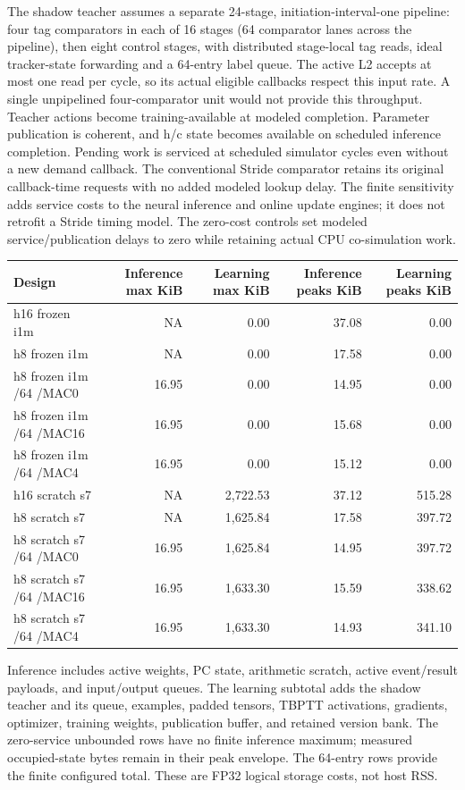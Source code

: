 \documentclass[10pt]{article}
\begin{document}
The shadow teacher assumes a separate 24-stage, initiation-interval-one pipeline: four tag comparators in each of 16 stages (64 comparator lanes across the pipeline), then eight control stages, with distributed stage-local tag reads, ideal tracker-state forwarding and a 64-entry label queue. The active L2 accepts at most one read per cycle, so its actual eligible callbacks respect this input rate. A single unpipelined four-comparator unit would not provide this throughput. Teacher actions become training-available at modeled completion. Parameter publication is coherent, and h/c state becomes available on scheduled inference completion. Pending work is serviced at scheduled simulator cycles even without a new demand callback. The conventional Stride comparator retains its original callback-time requests with no added modeled lookup delay. The finite sensitivity adds service costs to the neural inference and online update engines; it does not retrofit a Stride timing model. The zero-cost controls set modeled service/publication delays to zero while retaining actual CPU co-simulation work.

\begin{center}
\scriptsize
\begin{longtable}{lrrrr}
\toprule
Design & Inference max KiB & Learning max KiB & Inference peaks KiB & Learning peaks KiB \\
\midrule
\endhead
h16 frozen i1m & NA & 0.00 & 37.08 & 0.00 \\
h8 frozen i1m & NA & 0.00 & 17.58 & 0.00 \\
h8 frozen i1m /64 /MAC0 & 16.95 & 0.00 & 14.95 & 0.00 \\
h8 frozen i1m /64 /MAC16 & 16.95 & 0.00 & 15.68 & 0.00 \\
h8 frozen i1m /64 /MAC4 & 16.95 & 0.00 & 15.12 & 0.00 \\
h16 scratch s7 & NA & 2,722.53 & 37.12 & 515.28 \\
h8 scratch s7 & NA & 1,625.84 & 17.58 & 397.72 \\
h8 scratch s7 /64 /MAC0 & 16.95 & 1,625.84 & 14.95 & 397.72 \\
h8 scratch s7 /64 /MAC16 & 16.95 & 1,633.30 & 15.59 & 338.62 \\
h8 scratch s7 /64 /MAC4 & 16.95 & 1,633.30 & 14.93 & 341.10 \\
\bottomrule
\end{longtable}
\end{center}

Inference includes active weights, PC state, arithmetic scratch, active event/result payloads, and input/output queues. The learning subtotal adds the shadow teacher and its queue, examples, padded tensors, TBPTT activations, gradients, optimizer, training weights, publication buffer, and retained version bank. The zero-service unbounded rows have no finite inference maximum; measured occupied-state bytes remain in their peak envelope. The 64-entry rows provide the finite configured total. These are FP32 logical storage costs, not host RSS.
\end{document}

